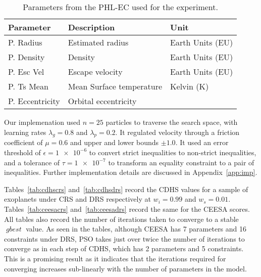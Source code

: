 \documentclass[9pt]{article}
\DeclareMathOperator*{\gbest}{\mathit{gbest}}
\begin{document}
\begin{table}
  \begin{center}
    \begin{tabular}{l l l}
      \toprule
      \textbf{Parameter} & \textbf{Description} & \textbf{Unit}\\
      \midrule
      P. Radius       & Estimated radius         & Earth Units (EU)\\
      P. Density      & Density                  & Earth Units (EU)\\
      P. Esc Vel      & Escape velocity          & Earth Units (EU)\\
      P. Ts Mean      & Mean Surface temperature & Kelvin (K)\\
      P. Eccentricity & Orbital eccentricity\\
      \bottomrule
    \end{tabular}
  \end{center}
  \caption{Parameters from the PHL-EC used for the experiment.}\label{tab:param}
\end{table}

Our implemenation used $n=25$ particles to traverse the search space, with learning rates $\lambda_g=0.8$ and
$\lambda_p=0.2$. It regulated velocity through a friction coefficient of $\mu=0.6$ and upper and lower bounds $\pm1.0$.
It used an error threshold of $\epsilon=\num{1e-6}$ to convert strict inequalities to non-strict inequalities, and a
tolerance of $\tau=\num{1e-7}$ to transform an equality constraint to a pair of inequalities. Further implementation
details are discussed in Appendix~\ref{app:imp}.

Tables~\ref{tab:cdhscrs} and~\ref{tab:cdhsdrs} record the CDHS values for a sample of exoplanets under CRS and DRS
respectively at $w_i=0.99$ and $w_s=0.01$. Tables~\ref{tab:ceesacrs} and~\ref{tab:ceesadrs} record the same for the
CEESA scores. All tables also record the number of iterations taken to converge to a stable $\gbest$ value. As seen in
the tables, although CEESA has 7 parameters and 16 constraints under DRS, PSO takes just over twice the number of
iterations to converge as in each step of CDHS, which has 2 parameters and 5 constraints. This is a promising result as
it indicates that the iterations required for converging increases sub-linearly with the number of parameters in the
model.
\end{document}
